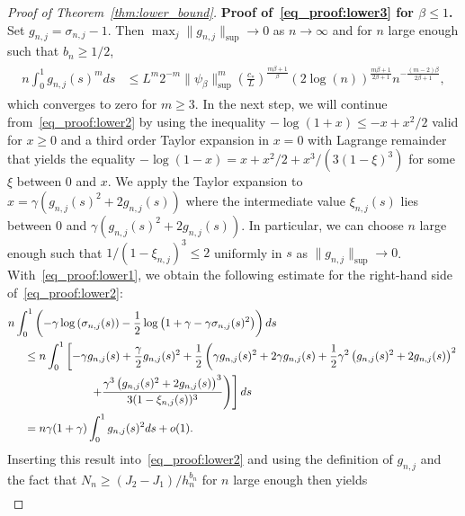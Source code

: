 \documentclass[10.5pt,letter]{article}
\numberwithin{equation}{section}
\theoremstyle{definition}
\newcommand{\E}{\mathbb{E}}
\renewcommand{\P}{\mathbb{P}}
\newcommand{\1}{\mathbbm{1}}
\begin{document}
\begin{proof}[Proof of Theorem~\ref{thm:lower_bound}]
\textbf{Proof of~\eqref{eq_proof:lower3} for $\beta\leq 1$.}
Set $g_{n,j}=\sigma_{n,j}-1$. Then $\max_j\|g_{n,j}\|_{\sup}\rightarrow 0$ as $n\to\infty$ and for $n$ large enough such that $b_n\geq 1/2 $,
\begin{align}\label{eq_proof:lower1}
\begin{split}
    n\int_0^1 g_{n,j}(s)^m ds 
    &\leq L^m2^{-m}\|\psi_\beta\|_{\sup}^m \left( \frac{c_*}{L}\right)^{\frac{m\beta+1}{\beta}} \left( 2\log(n)\right)^{\frac{m\beta+1}{2\beta+1}}  n^{-\frac{(m-2)\beta}
    {2\beta+1}},
\end{split}
\end{align} 
which converges to zero for $m\geq 3$. In the next step, we will continue from~\eqref{eq_proof:lower2} by using the inequality $-\log(1+x)\leq -x+x^2/2$ valid for $x\geq 0$ and a third order Taylor expansion in $x=0$ with Lagrange remainder that yields the equality $-\log(1-x)=x+x^2/2+x^3/(3(1-\xi)^3)$ for some $\xi$ between $0$ and $x$. We apply the Taylor expansion to $x=\gamma(g_{n,j}(s)^2 + 2g_{n,j}(s))$ where the intermediate value $\xi_{n,j}(s)$ lies between $0$ and $\gamma(g_{n,j}(s)^2 + 2g_{n,j}(s))$. In particular, we can choose $n$ large enough such that $1/(1-\xi_{n,j})^3 \leq 2$ uniformly in $s$ as $\|g_{n,j}\|_{\sup}\rightarrow 0$. With~\eqref{eq_proof:lower1}, we obtain the following estimate for the right-hand side of~\eqref{eq_proof:lower2}:
\begin{align*}
  & n\int_0^1 \left( -\gamma\log\left(\sigma_{n,j}(s)\right) - \frac12\log\left( 1+\gamma-\gamma\sigma_{n,j}(s)^2\right) \right) ds \\
    &\hspace{0.5cm} \leq n\int_0^1 \left[-\gamma g_{n,j}(s) + \frac{\gamma}{2} g_{n,j}(s)^2 + \frac12\left( \gamma g_{n,j}(s)^2 + 2\gamma g_{n,j}(s) + \frac12 \gamma^2 \left( g_{n,j}(s)^2 + 2g_{n,j}(s)\right)^2 \right.\right.\\
    &\hspace{2.5cm} \left.\left. + \frac{\gamma^3 \left( g_{n,j}(s)^2 + 2g_{n,j}(s)\right)^3}{3(1-\xi_{n,j}(s))^3}\right)\right] ds  \\
    &\hspace{0.5cm} = n \gamma (1+\gamma) \int_0^1 g_{n,j}(s)^2 ds + o(1). 
\end{align*}
Inserting this result into~\eqref{eq_proof:lower2} and using the definition of $g_{n,j}$ and the fact that $N_n\geq (J_2-J_1)/h_n^{b_n}$ for $n$ large enough then yields 
\begin{align*}

\end{align*}
\end{proof}
\end{document}
